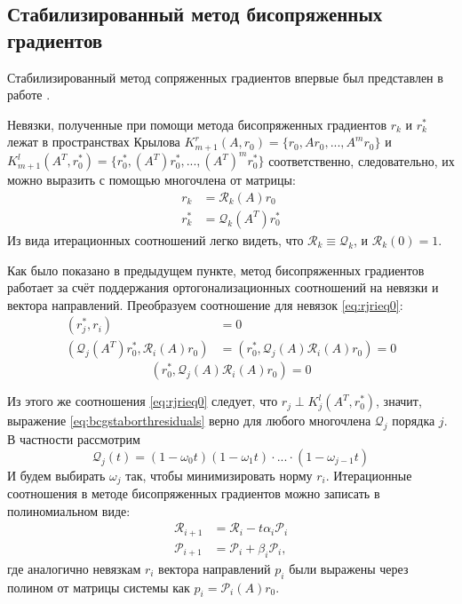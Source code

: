 \subsection[Стабилизированный метод бисопряженных градиентов]{Стабилизированный метод бисопряженных градиентов }
Стабилизированный метод сопряженных градиентов впервые был представлен в работе \cite{doi:10.1137/0913035}.

Невязки, полученные при помощи метода бисопряженных градиентов $r_k$ и $r_k^*$ лежат в пространствах
Крылова $K_{m+1}^r(A, r_0) = \{r_0,A r_0, ... , A^m r_0\}$ и \\$K_{m+1}^l(A^T, r_0^*) = \{r_0^*,(A^T) r_0^*, ... , (A^T)^m r_0^*\}$ соответственно,
следовательно, их можно выразить с помощью многочлена от матрицы:
\begin{align*}
    r_k &= \mathcal{R}_k(A)r_0 \\
    r_k^* &= \mathcal{Q}_k(A^T)r_0^*
\end{align*}
Из вида итерационных соотношений легко видеть, что $\mathcal{R}_k \equiv \mathcal{Q}_k$,
 и $\mathcal{R}_k(0) = 1$. 

 \par Как было показано в предыдущем пункте, метод бисопряженных градиентов работает
 за счёт поддержания ортогонализационных соотношений на невязки и вектора направлений.
 Преобразуем соотношение для невязок \eqref{eq:rjrieq0}:
 \begin{align*}
    (r_j^*,r_i) &= 0 \\
    (\mathcal{Q}_j(A^T)r_0^*,\mathcal{R}_i(A)r_0) &= (r_0^*,\mathcal{Q}_j(A)\mathcal{R}_i(A)r_0) = 0 
 \end{align*}
 \begin{equation}
    \label{eq:bcgstaborthresiduals}
    (r_0^*,\mathcal{Q}_j(A)\mathcal{R}_i(A)r_0) = 0
 \end{equation}

Из этого же соотношения \eqref{eq:rjrieq0} следует, что $r_j \perp K^l_{j} (A^T, r_0^*)$, 
значит, выражение \eqref{eq:bcgstaborthresiduals} верно для любого многочлена $\mathcal{Q}_j$ порядка $j$.
В частности рассмотрим 
\begin{equation}
    \label{eq:bcgstabq}
    \mathcal{Q}_j(t) = (1-\omega_0 t)(1-\omega_1 t)\cdot...\cdot(1-\omega_{j-1} t)
\end{equation}
И будем выбирать $\omega_j$ так, чтобы минимизировать норму $r_i$.
Итерационные соотношения в методе бисопряженных градиентов можно записать в полиномиальном виде:
\begin{align}
    \mathcal{R}_{i+1} &= \mathcal{R}_i - t \alpha_i \mathcal{P}_i \\
    \mathcal{P}_{i+1} &= \mathcal{P}_i + \beta_i \mathcal{P}_i,
\end{align} 
где аналогично невязкам $r_i$ вектора направлений $p_i$ были выражены через 
полином от матрицы системы как $p_i = \mathcal{P}_i(A)r_0$. 


